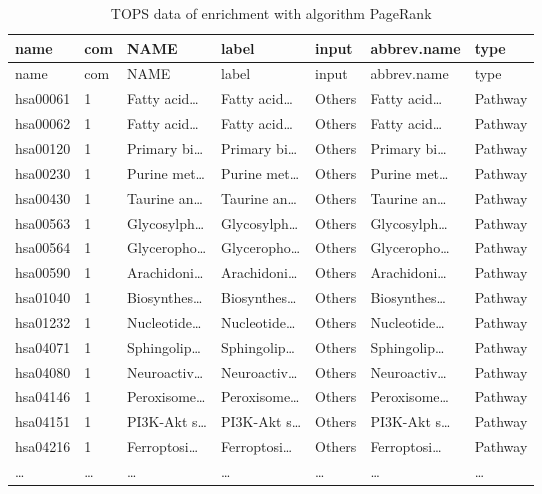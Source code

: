\documentclass[
]{article}
\begin{document}
\begin{longtable}[]{@{}lllllll@{}}
\caption{\label{tab:TOPS-data-of-enrichment-with-algorithm-PageRank}TOPS data of enrichment with algorithm PageRank}\tabularnewline
\toprule
name & com & NAME & label & input & abbrev.name & type\tabularnewline
\midrule
\endfirsthead
\toprule
name & com & NAME & label & input & abbrev.name & type\tabularnewline
\midrule
\endhead
hsa00061 & 1 & Fatty acid\ldots{} & Fatty acid\ldots{} & Others & Fatty acid\ldots{} & Pathway\tabularnewline
hsa00062 & 1 & Fatty acid\ldots{} & Fatty acid\ldots{} & Others & Fatty acid\ldots{} & Pathway\tabularnewline
hsa00120 & 1 & Primary bi\ldots{} & Primary bi\ldots{} & Others & Primary bi\ldots{} & Pathway\tabularnewline
hsa00230 & 1 & Purine met\ldots{} & Purine met\ldots{} & Others & Purine met\ldots{} & Pathway\tabularnewline
hsa00430 & 1 & Taurine an\ldots{} & Taurine an\ldots{} & Others & Taurine an\ldots{} & Pathway\tabularnewline
hsa00563 & 1 & Glycosylph\ldots{} & Glycosylph\ldots{} & Others & Glycosylph\ldots{} & Pathway\tabularnewline
hsa00564 & 1 & Glyceropho\ldots{} & Glyceropho\ldots{} & Others & Glyceropho\ldots{} & Pathway\tabularnewline
hsa00590 & 1 & Arachidoni\ldots{} & Arachidoni\ldots{} & Others & Arachidoni\ldots{} & Pathway\tabularnewline
hsa01040 & 1 & Biosynthes\ldots{} & Biosynthes\ldots{} & Others & Biosynthes\ldots{} & Pathway\tabularnewline
hsa01232 & 1 & Nucleotide\ldots{} & Nucleotide\ldots{} & Others & Nucleotide\ldots{} & Pathway\tabularnewline
hsa04071 & 1 & Sphingolip\ldots{} & Sphingolip\ldots{} & Others & Sphingolip\ldots{} & Pathway\tabularnewline
hsa04080 & 1 & Neuroactiv\ldots{} & Neuroactiv\ldots{} & Others & Neuroactiv\ldots{} & Pathway\tabularnewline
hsa04146 & 1 & Peroxisome\ldots{} & Peroxisome\ldots{} & Others & Peroxisome\ldots{} & Pathway\tabularnewline
hsa04151 & 1 & PI3K-Akt s\ldots{} & PI3K-Akt s\ldots{} & Others & PI3K-Akt s\ldots{} & Pathway\tabularnewline
hsa04216 & 1 & Ferroptosi\ldots{} & Ferroptosi\ldots{} & Others & Ferroptosi\ldots{} & Pathway\tabularnewline
\ldots{} & \ldots{} & \ldots{} & \ldots{} & \ldots{} & \ldots{} & \ldots{}\tabularnewline
\bottomrule
\end{longtable}

\begin{center}\vspace{1.5cm}\end{center}

\begin{center}\vspace{1.5cm}\end{center}
\end{document}
